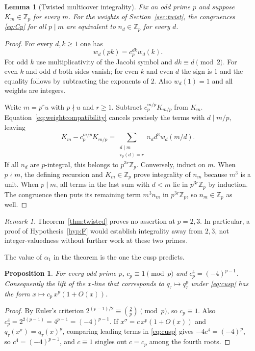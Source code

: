 \documentclass[11pt]{amsart}
\newtheorem{proposition}[theorem]{Proposition}
\newtheorem{lemma}[theorem]{Lemma}
\theoremstyle{definition}
\theoremstyle{remark}
\newtheorem{remark}[theorem]{Remark}
\newcommand{\Z}{\mathbb{Z}}
\newcommand{\leg}[2]{\left(\frac{#1}{#2}\right)}
\begin{document}
\begin{lemma}[Twisted multicover integrality]\label{lem:multicover}
Fix an odd prime $p$ and suppose $K_m\in\Z_p$ for every $m$.
For the weights of Section~\ref{sec:twist}, the congruences \eqref{eq:Cp} for all $p\mid m$
are equivalent to $n_d\in\Z_p$ for every $d$.
\end{lemma}
\begin{proof}
For every $d,k\ge1$ one has
\begin{equation}\label{eq:weightcompatibility}
w_d(pk)=c_p^{dk}w_d(k).
\end{equation}
For odd $k$ use multiplicativity of the Jacobi symbol and $dk\equiv d\pmod2$.
For even $k$ and odd $d$ both sides vanish; for even $k$ and even $d$ the
sign is $1$ and the equality follows by subtracting the exponents of $2$.
Also $w_d(1)=1$ and all weights are integers.

Write $m=p^r u$ with $p\nmid u$ and $r\ge1$.
Subtract $c_p^{m/p}K_{m/p}$ from $K_m$. Equation~\eqref{eq:weightcompatibility}
cancels precisely the terms with $d\mid m/p$, leaving
\[
K_m-c_p^{m/p}K_{m/p}
=\sum_{\substack{d\mid m\\v_p(d)=r}}n_d d^3 w_d(m/d).
\]
If all $n_d$ are $p$-integral, this belongs to $p^{3r}\Z_p$.
Conversely, induct on $m$. When $p\nmid m$, the defining recursion and
$K_m\in\Z_p$ prove integrality of $n_m$ because $m^3$ is a unit.
When $p\mid m$, all terms in the last sum with $d<m$ lie in $p^{3r}\Z_p$ by
induction. The congruence then puts its remaining term $m^3n_m$ in
$p^{3r}\Z_p$, so $n_m\in\Z_p$ as well.
\end{proof}

\begin{remark}
Theorem~\ref{thm:twisted} proves no assertion at $p=2,3$. In particular, a proof
of Hypothesis~\ref{hyp:F} would establish integrality away from $2,3$, not
integer-valuedness without further work at these two primes.
\end{remark}

The value of $\alpha_1$ in the theorem is the one the cusp predicts.

\begin{proposition}\label{prop:alpha}
For every odd prime $p$, $c_p\equiv1\pmod p$ and $c_p^4=(-4)^{p-1}$. Consequently the lift of the
$x$-line that corresponds to $q_\tau\mapsto q_\tau^p$ under \eqref{eq:cusp} has the form
$x\mapsto c_p\,x^p(1+O(x))$.
\end{proposition}

\begin{proof}
By Euler's criterion $2^{(p-1)/2}\equiv\leg2p\pmod p$, so $c_p\equiv1$. Also
$c_p^4=2^{2(p-1)}=4^{p-1}=(-4)^{p-1}$. If $x^\sigma=c\,x^p(1+O(x))$ and $q_\tau(x^\sigma)=q_\tau(x)^p$,
comparing leading terms in \eqref{eq:cusp} gives $-4c^4=(-4)^p$, so $c^4=(-4)^{p-1}$, and $c\equiv1$
singles out $c=c_p$ among the fourth roots.
\end{proof}
\end{document}
